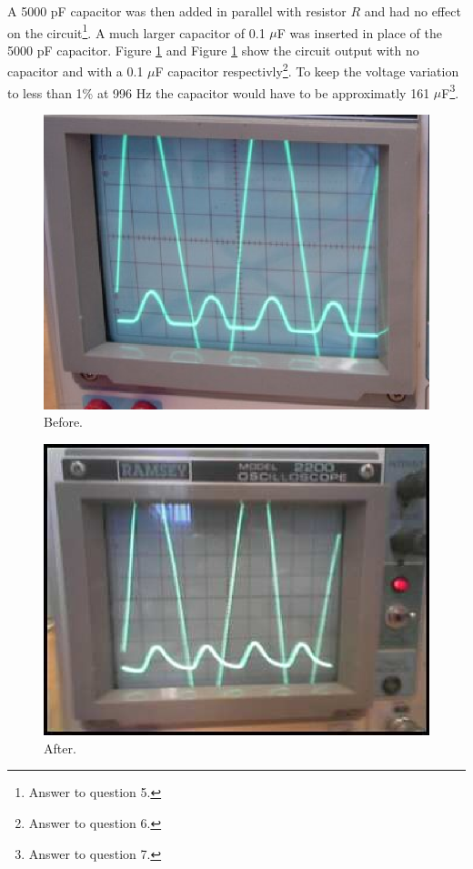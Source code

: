 \documentclass[11pt,onecolumn]{article}
\begin{document}
A 5000 pF capacitor was then added in parallel with resistor $R$ and had no effect on the circuit\footnote{Answer to question 5.}. A much larger capacitor of 0.1 $\mu$F was inserted in place of the 5000 pF capacitor. Figure \ref{fig:Image4} and Figure \ref{fig:Image4} show the circuit output with no capacitor and with a 0.1 $\mu$F capacitor respectivly\footnote{Answer to question 6.}. To keep the voltage variation to less than 1\% at 996 Hz the capacitor would have to be approximatly 161 $\mu$F\footnote{Answer to question 7.}.
%
%
\begin{figure}
\begin{center}
\includegraphics{Image4.eps}
\end{center}
\caption{Before.}\label{fig:Image4}
\end{figure}
%
%
\begin{figure}
\begin{center}
\includegraphics{Image5.eps}
\end{center}
\caption{After.}\label{fig:Image5}
\end{figure}
\end{document}
